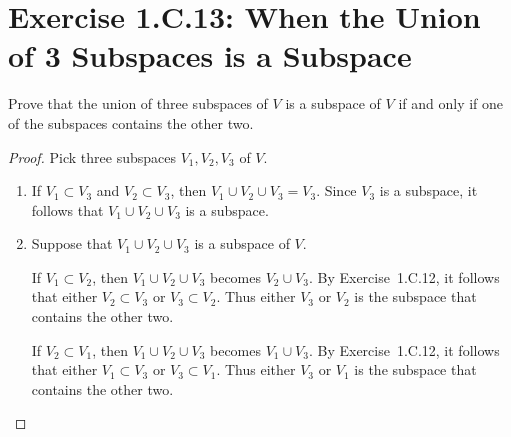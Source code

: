 \section{Exercise 1.C.13: When the Union of 3 Subspaces is a Subspace}\label{Exercise 1.C.13}
Prove that the union of three subspaces of $V$ is a subspace of $V$ if and only if one of the subspaces contains the other two.
\begin{proof}
Pick three subspaces $V_1, V_2, V_3$ of $V$.
\begin{enumerate}
\item If $V_1\subset V_3$ and $V_2\subset V_3$, then $V_1\cup V_2\cup V_3=V_3$. Since $V_3$ is a subspace, it follows that $V_1\cup V_2\cup V_3$ is a subspace.
\item Suppose that $V_1\cup V_2\cup V_3$ is a subspace of $V$.

If $V_1\subset V_2$, then $V_1\cup V_2\cup V_3$ becomes $V_2\cup V_3$. By Exercise~1.C.12, it follows that either $V_2\subset V_3$ or $V_3 \subset V_2$. Thus either $V_3$ or $V_2$ is the subspace that contains the other two.

If $V_2\subset V_1$, then $V_1\cup V_2\cup V_3$ becomes $V_1\cup V_3$. By Exercise~1.C.12, it follows that either $V_1\subset V_3$ or $V_3 \subset V_1$. Thus either $V_3$ or $V_1$ is the subspace that contains the other two.


\end{enumerate}
\end{proof}
